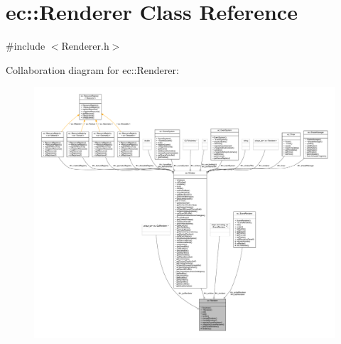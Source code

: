 \hypertarget{classec_1_1_renderer}{}\section{ec\+:\+:Renderer Class Reference}
\label{classec_1_1_renderer}


{\ttfamily \#include $<$Renderer.\+h$>$}



Collaboration diagram for ec\+:\+:Renderer\+:\nopagebreak
\begin{figure}[H]
\begin{center}
\leavevmode
\includegraphics[width=350pt]{classec_1_1_renderer__coll__graph}
\end{center}
\end{figure}
